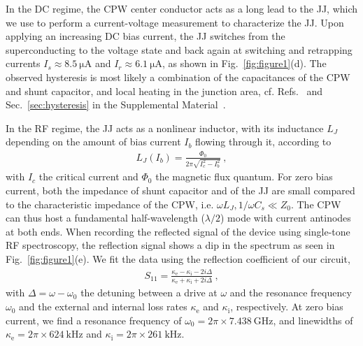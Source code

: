 % 
In the DC regime, the CPW center conductor acts as a long lead to the JJ, which we use to perform a current-voltage measurement to characterize the JJ.
% 
Upon applying an increasing DC bias current, the JJ switches from the superconducting to the voltage state and back again at switching and retrapping currents $I_s\approx\SI{8.5}{\micro\ampere}$ and $I_r\approx\SI{6.1}{\micro\ampere}$, as shown in Fig.~\ref{fig:figure1}(d).
% 
The observed hysteresis is most likely a combination of the capacitances of the CPW and shunt capacitor, and local heating in the junction area, cf. Refs.~\cite{tinkhamIntroductionSuperconductivity1996,skocpolSelfHeatingHotspots1974,hazraHysteresisSuperconductingShort2010,kumarReversibilitySuperconductingNb2015} and Sec.~\ref{sec:hysteresis} in the Supplemental Material~\cite{SeeSupplementalMaterial}.

In the RF regime, the JJ acts as a nonlinear inductor, with its inductance $L_J$ depending on the amount of bias current $I_b$ flowing through it, according to
% 
\begin{align}
L_J(I_b)= \frac{\Phi_0}{2\pi \sqrt{I_c^2-I_b^2}}\ ,
\label{eq:Lj-of-I}
\end{align}
% 
with $I_c$ the critical current and $\Phi_0$ the magnetic flux quantum.
% 
For zero bias current, both the impedance of shunt capacitor and of the JJ are small compared to the characteristic impedance of the CPW, i.e. $\omega L_J,1/\omega C_s \ll Z_0$.
% 
The CPW can thus host a fundamental half-wavelength ($\lambda/2$) mode with current antinodes at both ends.
% 
When recording the reflected signal of the device using single-tone RF spectroscopy, the reflection signal shows a dip in the spectrum as seen in Fig.~\ref{fig:figure1}(e).
% 
We fit the data using the reflection coefficient of our circuit,
% 
\begin{align}
S_{11} = \frac{\kappa_\text{e}-\kappa_\text{i}-2i\Delta}{\kappa_\text{e}+\kappa_\text{i}+2i\Delta}\ ,
\label{eq:general:S11}
\end{align}
% 
with $\Delta=\omega-\omega_0$ the detuning between a drive at $\omega$ and the resonance frequency $\omega_0$ and the external and internal loss rates $\kappa_\text{e}$ and $\kappa_\text{i}$, respectively.
% 
At zero bias current, we find a resonance frequency of $\omega_0=2\pi\times\SI{7.438}{\giga\hertz}$, and linewidths of $\kappa_\text{e}=2\pi\times\SI{624}{\kilo\hertz}$ and $\kappa_\text{i}=2\pi\times\SI{261}{\kilo\hertz}$.

